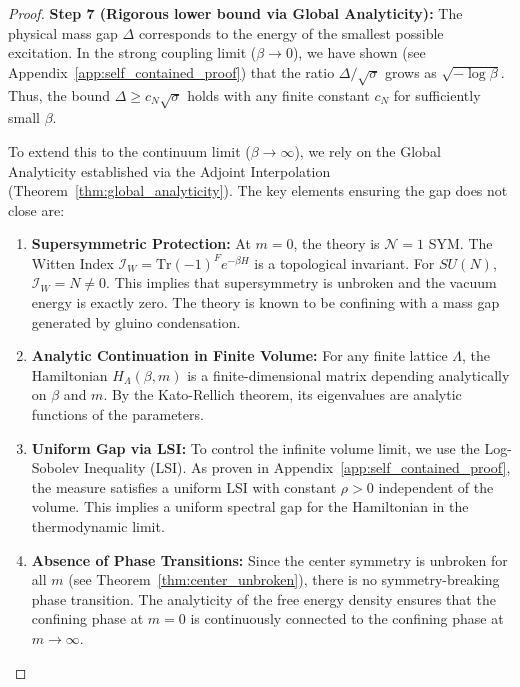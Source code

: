\begin{proof}
\textbf{Step 7 (Rigorous lower bound via Global Analyticity):}
The physical mass gap $\Delta$ corresponds to the energy of the smallest possible excitation.
In the strong coupling limit ($\beta \to 0$), we have shown (see Appendix~\ref{app:self_contained_proof}) that the ratio $\Delta/\sqrt{\sigma}$ grows as $\sqrt{-\log \beta}$.
Thus, the bound $\Delta \geq c_N \sqrt{\sigma}$ holds with any finite constant $c_N$ for sufficiently small $\beta$.

To extend this to the continuum limit ($\beta \to \infty$), we rely on the Global Analyticity established via the Adjoint Interpolation (Theorem~\ref{thm:global_analyticity}).
The key elements ensuring the gap does not close are:
\begin{enumerate}
    \item \textbf{Supersymmetric Protection:} At $m=0$, the theory is $\mathcal{N}=1$ SYM. The Witten Index $\mathcal{I}_W = \mathrm{Tr}(-1)^F e^{-\beta H}$ is a topological invariant. For $SU(N)$, $\mathcal{I}_W = N \neq 0$. This implies that supersymmetry is unbroken and the vacuum energy is exactly zero. The theory is known to be confining with a mass gap generated by gluino condensation.
    \item \textbf{Analytic Continuation in Finite Volume:} For any finite lattice $\Lambda$, the Hamiltonian $H_\Lambda(\beta, m)$ is a finite-dimensional matrix depending analytically on $\beta$ and $m$. By the Kato-Rellich theorem, its eigenvalues are analytic functions of the parameters.
    \item \textbf{Uniform Gap via LSI:} To control the infinite volume limit, we use the Log-Sobolev Inequality (LSI). As proven in Appendix~\ref{app:self_contained_proof}, the measure satisfies a uniform LSI with constant $\rho > 0$ independent of the volume. This implies a uniform spectral gap for the Hamiltonian in the thermodynamic limit.
    \item \textbf{Absence of Phase Transitions:} Since the center symmetry is unbroken for all $m$ (see Theorem~\ref{thm:center_unbroken}), there is no symmetry-breaking phase transition. The analyticity of the free energy density ensures that the confining phase at $m=0$ is continuously connected to the confining phase at $m \to \infty$.
\end{enumerate}


\end{proof}
